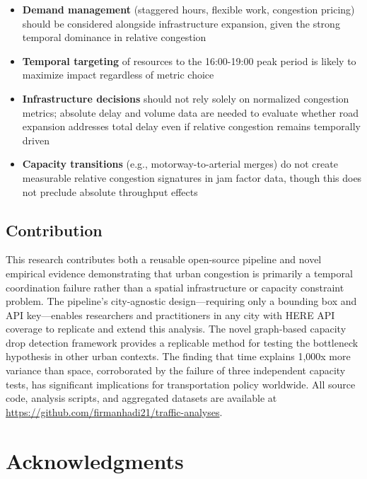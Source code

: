 \documentclass[12pt,a4paper]{article}
\begin{document}
\begin{itemize}

\item
  \textbf{Demand management} (staggered hours, flexible work, congestion pricing) should be considered alongside infrastructure expansion, given the strong temporal dominance in relative congestion
\item
  \textbf{Temporal targeting} of resources to the 16:00-19:00 peak period is likely to maximize impact regardless of metric choice
\item
  \textbf{Infrastructure decisions} should not rely solely on normalized congestion metrics; absolute delay and volume data are needed to evaluate whether road expansion addresses total delay even if relative congestion remains temporally driven
\item
  \textbf{Capacity transitions} (e.g., motorway-to-arterial merges) do not create measurable relative congestion signatures in jam factor data, though this does not preclude absolute throughput effects
\end{itemize}

\subsection{Contribution}

This research contributes both a reusable open-source pipeline and novel empirical evidence demonstrating that urban congestion is primarily a temporal coordination failure rather than a spatial infrastructure or capacity constraint problem. The pipeline's city-agnostic design---requiring only a bounding box and API key---enables researchers and practitioners in any city with HERE API coverage to replicate and extend this analysis. The novel graph-based capacity drop detection framework provides a replicable method for testing the bottleneck hypothesis in other urban contexts. The finding that time explains 1,000x more variance than space, corroborated by the failure of three independent capacity tests, has significant implications for transportation policy worldwide. All source code, analysis scripts, and aggregated datasets are available at \url{https://github.com/firmanhadi21/traffic-analyses}.



\section*{Acknowledgments}
\end{document}

